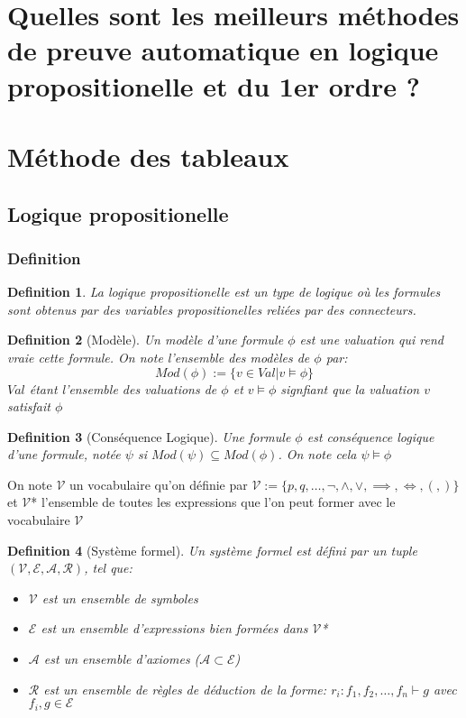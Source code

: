 \documentclass{paper}
\newtheorem{defi}{Definition}
\begin{document}
\setlength{\headheight}{13.07225pt}
\addtolength{\topmargin}{-1.07225pt}

\section*{Quelles sont les meilleurs méthodes de preuve automatique en logique propositionelle et du 1er ordre ?}

\section{Méthode des tableaux}
\subsection{Logique propositionelle}
\subsubsection{Definition}
\begin{defi}
La \textit{logique propositionelle} est un type de logique où les formules sont obtenus par des variables propositionelles reliées par des connecteurs.
\end{defi}
\begin{defi}[Modèle]
    Un \textit{modèle} d'une formule $\phi$ est une valuation qui rend vraie cette formule. On note l'ensemble des modèles de $\phi$ par:
    $$Mod(\phi) := \{v\in Val | v \vDash \phi\}$$
    $Val$ étant l'ensemble des valuations de $\phi$ et $v \vDash \phi$ signfiant que la valuation $v$ satisfait $\phi$
\end{defi}
\begin{defi}[Conséquence Logique]
    Une formule $\phi$ est \textit{conséquence logique} d'une formule, notée $\psi$ si $Mod(\psi) \subseteq Mod(\phi)$. On note cela $\psi \vDash \phi$
\end{defi}

On note $\mathcal{V}$ un vocabulaire qu'on définie par $\mathcal{V} := \{p, q,\dots, \lnot, \land, \lor, \implies, \Leftrightarrow, (,) \}$ et $\mathcal{V}$* l'ensemble de toutes les expressions que l'on peut former avec le vocabulaire $\mathcal{V}$
\begin{defi}[Système formel]
    Un système formel est défini par un tuple $(\mathcal{V}, \mathcal{E}, \mathcal{A}, \mathcal{R})$, tel que:
    \begin{itemize}
        \item $\mathcal{V}$ est un ensemble de symboles
        \item $\mathcal{E}$ est un ensemble d'expressions bien formées dans $\mathcal{V}$*
        \item $\mathcal{A}$ est un ensemble d'axiomes ($\mathcal{A} \subset \mathcal{E}$)
        \item $\mathcal{R}$ est un ensemble de règles de déduction de la forme: $r_i : f_1, f_2,\dots, f_n \vdash g$ avec $f_i, g \in \mathcal{E}$
    \end{itemize}
\end{defi}
\end{document}
